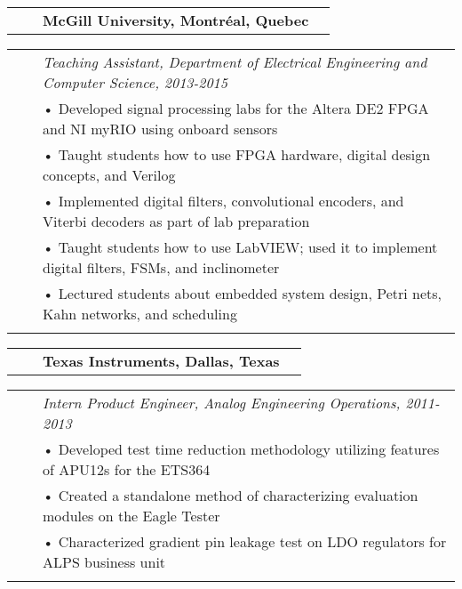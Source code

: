 \documentclass{minimal}
\begin{document}
\begin{tabular}{ p{1.5cm} p{1cm} p{10cm} >{\raggedleft\arraybackslash}p{3cm} }
& & \textbf{McGill University, Montréal, Quebec} & \\
\end{tabular}

\begin{tabular}{ p{1.5cm} p{1cm} p{16cm} }
& & \textit{Teaching Assistant, Department of Electrical Engineering and Computer Science, 2013-2015}\\
& & • Developed signal processing labs for the Altera DE2 FPGA and NI myRIO using onboard sensors\\
& & • Taught students how to use FPGA hardware, digital design concepts, and Verilog\\
& & • Implemented digital filters, convolutional encoders, and Viterbi decoders as part of lab preparation\\
& & • Taught students how to use LabVIEW; used it to implement digital filters, FSMs, and inclinometer\\
& & • Lectured students about embedded system design, Petri nets, Kahn networks, and scheduling\\
& & \\
\end{tabular}

\begin{tabular}{ p{1.5cm} p{1cm} p{10cm} >{\raggedleft\arraybackslash}p{3cm} }
& & \textbf{Texas Instruments, Dallas, Texas} & \\
\end{tabular}

\vspace{1cm}

\begin{tabular}{ p{1.5cm} p{1cm} p{16cm} }
& & \textit{Intern Product Engineer, Analog Engineering Operations, 2011-2013}\\
& & • Developed test time reduction methodology utilizing features of APU12s for the ETS364\\
& & • Created a standalone method of characterizing evaluation modules on the Eagle Tester\\
& & • Characterized gradient pin leakage test on LDO regulators for ALPS business unit\\
& & \\
\end{tabular}
\end{document}
